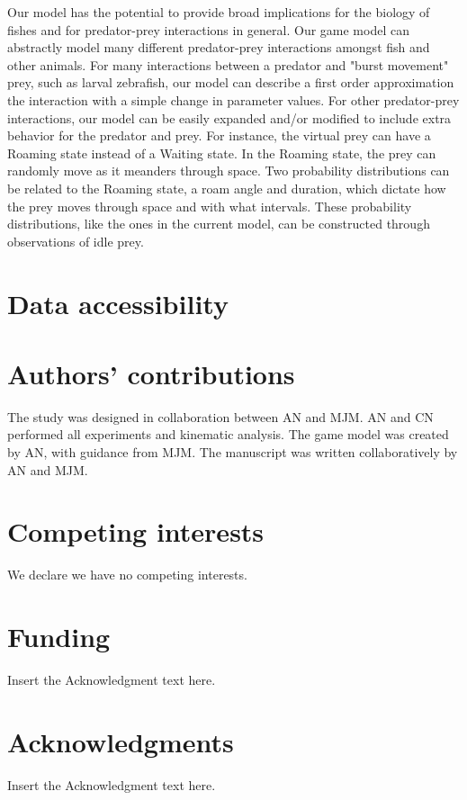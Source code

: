 \documentclass[]{rsos}%
\begin{document}
Our model has the potential to provide broad implications for the biology of fishes and for predator-prey interactions in general.
Our game model can abstractly model many different predator-prey interactions amongst fish and other animals. 
For many interactions between a predator and "burst movement" prey, such as larval zebrafish, our model can describe a first order approximation the interaction with a simple change in parameter values.
For other predator-prey interactions, our model can be easily expanded and/or modified to include extra behavior for the predator and prey.
For instance, the virtual prey can have a Roaming state instead of a Waiting state.
In the Roaming state, the prey can randomly move as it meanders through space.
Two probability distributions can be related to the Roaming state, a roam angle and duration, which dictate how the prey moves through space and with what intervals.
 These probability distributions, like the ones in the current model, can be constructed through observations of idle prey. 



\section*{Data accessibility}


\section*{Authors' contributions}
The study was designed in collaboration between AN and MJM.
AN and CN performed all experiments and kinematic analysis.
The game model was created by AN, with guidance from MJM. 
The manuscript was written collaboratively by AN and MJM.

\section*{Competing interests}
We declare we have no competing interests.

\section*{Funding}
Insert the Acknowledgment text here.

\section*{Acknowledgments}
Insert the Acknowledgment text here.
\end{document}
